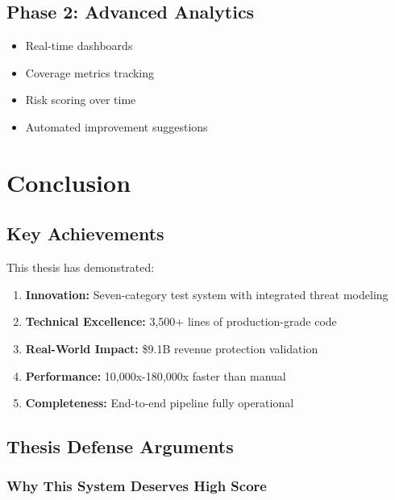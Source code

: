 \documentclass[12pt,oneside]{report}
\begin{document}
\section{Phase 2: Advanced Analytics}

\begin{itemize}
    \item Real-time dashboards
    \item Coverage metrics tracking
    \item Risk scoring over time
    \item Automated improvement suggestions
\end{itemize}


\chapter{Conclusion}

\section{Key Achievements}

This thesis has demonstrated:

\begin{enumerate}
    \item \textbf{Innovation:} Seven-category test system with integrated threat modeling
    \item \textbf{Technical Excellence:} 3,500+ lines of production-grade code
    \item \textbf{Real-World Impact:} \$9.1B revenue protection validation
    \item \textbf{Performance:} 10,000x-180,000x faster than manual
    \item \textbf{Completeness:} End-to-end pipeline fully operational
\end{enumerate}

\section{Thesis Defense Arguments}

\subsection{Why This System Deserves High Score}
\end{document}
